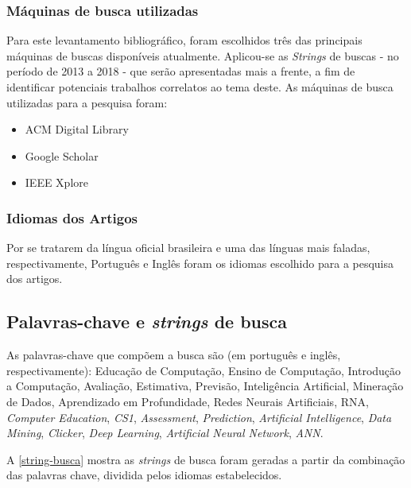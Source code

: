\subsubsection{Máquinas de busca utilizadas}
Para este levantamento bibliográfico, foram escolhidos três das principais máquinas de buscas disponíveis atualmente. Aplicou-se as \textit{Strings} de buscas - no período de 2013 a 2018 - que serão apresentadas mais a frente, a fim de identificar potenciais trabalhos correlatos ao tema deste. As máquinas de busca utilizadas para a pesquisa foram:

\begin{itemize}
    \item ACM Digital Library
    \item Google Scholar
    \item IEEE Xplore
\end{itemize}

\subsubsection{Idiomas dos Artigos}
Por se tratarem da língua oficial brasileira e uma das línguas mais faladas, respectivamente, Português e Inglês foram os idiomas escolhido para a pesquisa dos artigos.

\subsection{Palavras-chave e \textit{strings} de busca}

As palavras-chave que compõem a busca são (em português e inglês, respectivamente): 
Educação de Computação, Ensino de Computação, Introdução a Computação, Avaliação, Estimativa, Previsão, Inteligência Artificial, Mineração de Dados, Aprendizado em Profundidade, Redes Neurais Artificiais, RNA, \textit{Computer Education}, \textit{CS1}, \textit{Assessment}, \textit{Prediction}, \textit{Artificial Intelligence}, \textit{Data Mining}, \textit{Clicker}, \textit{Deep Learning}, \textit{Artificial Neural Network}, \textit{ANN}.

A \autoref{string-busca} mostra as \textit{strings} de busca foram geradas a partir da combinação das palavras chave, dividida pelos idiomas estabelecidos.

